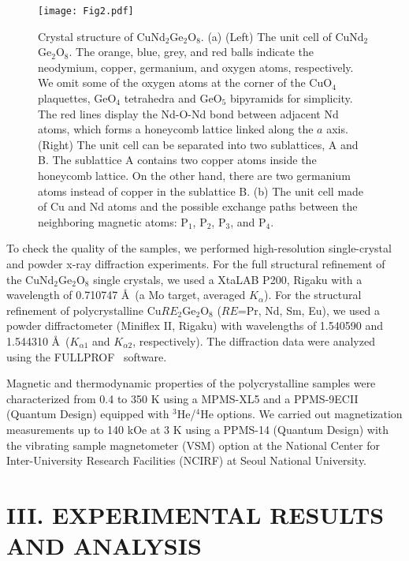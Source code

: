 \documentclass[aps,prl,reprint,amsmath,amssymb,superscriptaddress,showpacs]{revtex4-1}
\begin{document}
\begin{figure*}
\centering
\texttt{[image: Fig2.pdf]}
\caption{\label{fig2}Crystal structure of CuNd$_2$Ge$_2$O$_8$. (a) (Left) The unit cell of CuNd$_2$Ge$_2$O$_8$. The orange, blue, grey, and red balls indicate the neodymium, copper, germanium, and oxygen atoms, respectively. We omit some of the oxygen atoms at the corner of the CuO$_4$ plaquettes, GeO$_4$ tetrahedra and GeO$_5$ bipyramids for simplicity. The red lines display the Nd-O-Nd bond between adjacent Nd atoms, which forms a honeycomb lattice linked along the $a$ axis. (Right) The unit cell can be separated into two sublattices, A and B. The sublattice A contains two copper atoms inside the honeycomb lattice. On the other hand, there are two germanium atoms instead of copper in the sublattice B. (b) The unit cell made of Cu and Nd atoms and the possible exchange paths between the neighboring magnetic atoms: P$_1$, P$_2$, P$_3$, and P$_4$.}
\end{figure*}

To check the quality of the samples, we  performed high-resolution single-crystal and powder x-ray diffraction experiments. For the full structural refinement of the CuNd$_2$Ge$_2$O$_8$ single crystals, we used a XtaLAB P200, Rigaku with a wavelength of 0.710747 \AA~(a Mo target, averaged $K_{\alpha}$). For the structural refinement of polycrystalline Cu$RE_2$Ge$_2$O$_8$ ($RE$=Pr, Nd, Sm, Eu), we used a powder diffractometer (Miniflex II, Rigaku) with wavelengths of 1.540590 and 1.544310 \AA~($K_{\alpha1}$ and $K_{\alpha2}$, respectively). The diffraction data were analyzed using the FULLPROF~\cite{J.Rodriguez1993} software.

Magnetic and thermodynamic properties of the polycrystalline samples were characterized from 0.4 to 350 K using a MPMS-XL5 and a PPMS-9ECII (Quantum Design) equipped with $^3$He/$^4$He options. We carried out magnetization measurements up to 140 kOe at 3 K using a PPMS-14 (Quantum Design) with the vibrating sample magnetometer (VSM) option at the National Center for Inter-University Research Facilities (NCIRF) at Seoul National University.

\section{III. EXPERIMENTAL RESULTS AND ANALYSIS}
\end{document}
